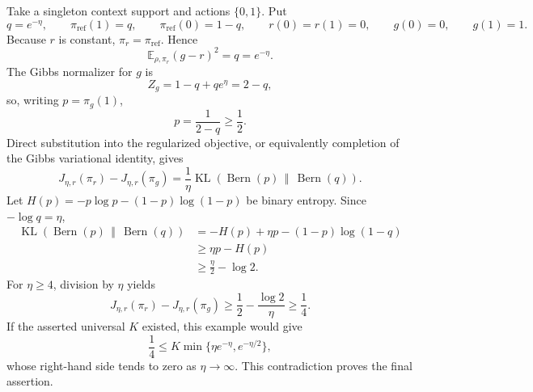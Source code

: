 Take a singleton context support and actions \(\{0,1\}\). Put
\[
q=e^{-\eta},\qquad
\pi_{\mathrm{ref}}(1)=q,\qquad
\pi_{\mathrm{ref}}(0)=1-q,\qquad
r(0)=r(1)=0,\qquad
g(0)=0,\qquad g(1)=1.
\]
Because \(r\) is constant, \(\pi_r=\pi_{\mathrm{ref}}\). Hence
\[
\mathbb E_{\rho,\pi_r}(g-r)^2=q=e^{-\eta}.
\]
The Gibbs normalizer for \(g\) is
\[
Z_g=1-q+qe^\eta=2-q,
\]
so, writing \(p=\pi_g(1)\),
\[
p=\frac1{2-q}\ge\frac12.
\]
Direct substitution into the regularized objective, or equivalently completion of the Gibbs variational identity, gives
\[
J_{\eta,r}(\pi_r)-J_{\eta,r}(\pi_g)
=\frac1\eta\operatorname{KL}\!\left(\operatorname{Bern}(p)\,\middle\Vert\,\operatorname{Bern}(q)\right).
\]
Let \(H(p)=-p\log p-(1-p)\log(1-p)\) be binary entropy. Since \(-\log q=\eta\),
\[
\begin{aligned}
\operatorname{KL}\!\left(\operatorname{Bern}(p)\,\middle\Vert\,\operatorname{Bern}(q)\right)
&=-H(p)+\eta p-(1-p)\log(1-q)\\
&\ge \eta p-H(p)\\
&\ge \frac\eta2-\log2.
\end{aligned}
\]
For \(\eta\ge4\), division by \(\eta\) yields
\[
J_{\eta,r}(\pi_r)-J_{\eta,r}(\pi_g)
\ge\frac12-\frac{\log2}{\eta}\ge\frac14.
\]
If the asserted universal \(K\) existed, this example would give
\[
\frac14
\le K\min\{\eta e^{-\eta},e^{-\eta/2}\},
\]
whose right-hand side tends to zero as \(\eta\to\infty\). This contradiction proves the final assertion.
